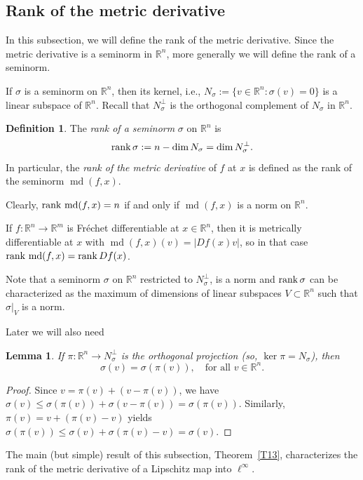 \documentclass[12pt,leqno]{amsart}
\newtheorem{lemma}[theorem]{Lemma}
\theoremstyle{definition}
\newtheorem{definition}[theorem]{Definition}
\newcommand{\bbbr}{\mathbb R}
\def\rank{{\rm rank\,}}
\def\md{\operatorname{md}}
\numberwithin{theorem}{section} \numberwithin{equation}{section}
\begin{document}
\subsection{Rank of the metric derivative}
In this subsection, we will define the rank of the metric derivative. Since the metric derivative is a seminorm in $\bbbr^n$, more generally we will define the rank of a seminorm.

If $\sigma$ is a seminorm on $\bbbr^n$, then its kernel, i.e., $N_\sigma:=\{v\in\bbbr^n\colon \sigma(v)=0\}$ is a linear subspace of $\bbbr^n$. Recall that $N_\sigma^\perp$ is the orthogonal complement of $N_\sigma$ in $\bbbr^n$.
\begin{definition}
\label{gum13}
The {\em rank of a seminorm} $\sigma$ on $\bbbr^n$ is
$$
\rank\sigma:=n-\dim N_\sigma=\dim N_\sigma^\perp.
$$
In particular, the {\em rank  of the metric derivative} of $f$ at $x$ is defined as the rank of the seminorm $\md(f,x)$.
\end{definition}
Clearly, $\rank\md(f,x)=n$ if and only if $\md(f,x)$ is a norm on $\bbbr^n$.


If $f:\bbbr^n\to\bbbr^m$ is Fr\'echet differentiable at $x\in\bbbr^n$, then it is metrically differentiable at $x$ with $\md(f,x)(v)=|Df(x)v|$, so in that case $\rank \md(f,x)=\rank Df(x)$.


Note that a seminorm $\sigma$ on $\bbbr^n$ restricted to $N_\sigma^\perp$, is a norm and $\rank\sigma$ can be characterized as the maximum of dimensions of linear subspaces $V\subset\bbbr^n$ such that $\sigma|_V$ is a norm.

Later we will also need
\begin{lemma}
\label{T16}
If $\pi:\bbbr^n\to N_\sigma^\perp$ is the orthogonal projection (so, $\ker\pi=N_\sigma$), then
$$
\sigma(v)=\sigma(\pi(v)),
\quad
\text{for all $v\in\bbbr^n$.}
$$
\end{lemma}
\begin{proof}
Since $v=\pi(v)+(v-\pi(v))$, we have
$
\sigma(v)\leq\sigma(\pi(v))+\sigma(v-\pi(v))=\sigma(\pi(v)).
$
Similarly, $\pi(v)=v+(\pi(v)-v)$ yields
$
\sigma(\pi(v))\leq\sigma(v)+\sigma(\pi(v)-v)=\sigma(v).
$
\end{proof}
The main (but simple) result of this subsection, Theorem~\ref{T13}, characterizes the rank of the metric derivative of a Lipschitz map into $\ell^\infty$.
\end{document}
